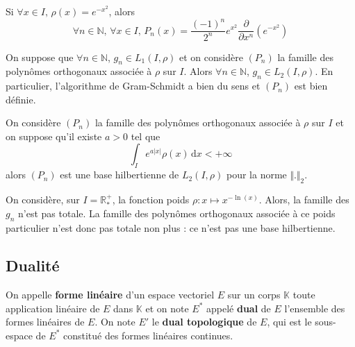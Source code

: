 	\begin{example}
		Si $\forall x \in I, \, \rho(x) = e^{-x^2}$, alors
		\[ \forall n \in \mathbb{N}, \, \forall x \in I, \, P_n(x) = \frac{(-1)^n}{2^n} e^{x^2} \frac{\partial}{\partial x^n} \left( e^{-x^2} \right) \]
	\end{example}


	\begin{lemma}
		On suppose que $\forall n \in \mathbb{N}$, $g_n \in L_1(I, \rho)$ et on considère $(P_n)$ la famille des polynômes orthogonaux associée à $\rho$ sur $I$. Alors $\forall n \in \mathbb{N}$, $g_n \in L_2(I, \rho)$. En particulier, l'algorithme de Gram-Schmidt a bien du sens et $(P_n)$ est bien définie.
	\end{lemma}

	\begin{application}
		On considère $(P_n)$ la famille des polynômes orthogonaux associée à $\rho$ sur $I$ et on suppose qu'il existe $a > 0$ tel que
		\[ \int_I e^{a \vert x \vert} \rho(x) \, \mathrm{d}x < +\infty \]
		alors $(P_n)$ est une base hilbertienne de $L_2(I, \rho)$ pour la norme $\Vert . \Vert_2$.
	\end{application}

	\begin{cexample}
		On considère, sur $I = \mathbb{R}^+_*$, la fonction poids $\rho : x \mapsto x^{-\ln(x)}$. Alors, la famille des $g_n$ n'est pas totale. La famille des polynômes orthogonaux associée à ce poids particulier n'est donc pas totale non plus : ce n'est pas une base hilbertienne.
	\end{cexample}

	\subsection{Dualité}


	\begin{definition}
		On appelle \textbf{forme linéaire} d'un espace vectoriel $E$ sur un corps $\mathbb{K}$ toute application linéaire de $E$ dans $\mathbb{K}$ et on note $E^*$ appelé \textbf{dual} de $E$ l'ensemble des formes linéaires de $E$.
		\newpar
		On note $E'$ le \textbf{dual topologique} de $E$, qui est le sous-espace de $E^*$ constitué des formes linéaires continues.
	\end{definition}


